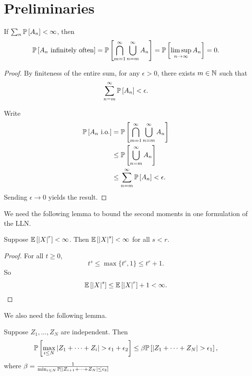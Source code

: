 \section{Preliminaries}

\begin{lemma}
	If $\sum_n \P\left[A_n\right] < \infty$, then \[
		\P\left[A_n \text{ infinitely often}\right] = \P\left[\bigcap\limits_{m=1}^{\infty} \bigcup\limits_{n=m}^{\infty} A_n\right] = \P\left[\limsup\limits_{n \to \infty} A_n\right] = 0
	.\] 
\end{lemma}

\begin{proof}
	By finiteness of the entire sum, for any $\epsilon > 0$, there exists $m \in \N$ such that \[
		\sum\limits_{n=m}^{\infty} \P\left[A_n\right]  < \epsilon
	.\] 

	Write
	\begin{align*}
		\P\left[A_n \text{ i.o.}\right] &= \P\left[\bigcap\limits_{m=1}^{\infty} \bigcup\limits_{n=m}^{\infty} A_n\right]  \\
										&\le \P\left[\bigcup\limits_{n=m}^{\infty} A_n\right] \\
										&\le \sum\limits_{n=m}^{\infty} \P\left[A_n\right] < \epsilon
	.\end{align*}
	Sending $\epsilon \to 0$ yields the result.
\end{proof}

We need the following lemma to bound the second moments in one formulation of the LLN.

\begin{lemma}
	Suppose $\E\left[\left| X \right|^{r}\right] < \infty$. Then $\E\left[\left| X \right|^{s}\right] < \infty$ for all $s < r$.
\end{lemma}
\begin{proof}
		For all $t \ge 0$,
		\[
			t^s \le \max\{t^r, 1\} \le t^r + 1.
		\]
		So
		\[
			\E\left[\left| X \right|^{s}\right] \le \E\left[\left| X \right|^{r}\right] +1 <\infty.
		\]
	\end{proof}

We also need the following lemma.

\begin{lemma} \label{1-29-1}
	Suppose $Z_1,\ldots,Z_N$ are independent.
	Then \[
		\P\left[\max_{i\le N} \left| Z_1+\cdots + Z_i \right| > \epsilon_1 + \epsilon_2\right] \le \beta \P\left[\left| Z_1+\cdots+Z_N\right| > \epsilon_1\right] 
	,\] 
	where $\beta = \frac{1}{\min_{i \le N} \P\left[\left| Z_{i+1} + \cdots + Z_N \right|\le \epsilon_2\right] }$
\end{lemma}


